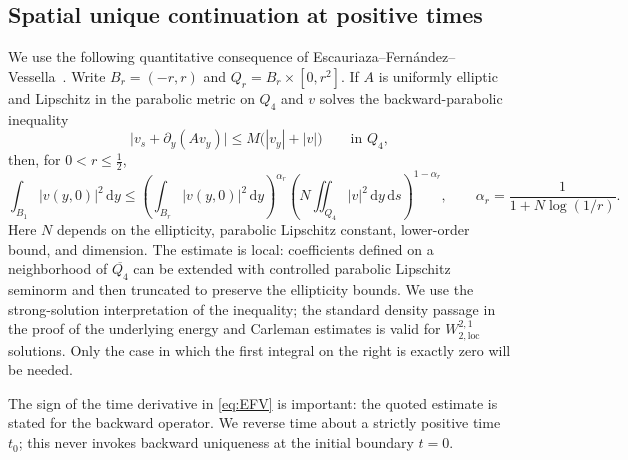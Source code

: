 \documentclass[11pt,reqno]{amsart}
\numberwithin{equation}{section}
\theoremstyle{definition}
\theoremstyle{remark}
\newcommand{\loc}{\mathrm{loc}}
\newcommand{\dd}{\,\mathrm d}
\begin{document}
\subsection{Spatial unique continuation at positive times}
We use the following quantitative consequence of
Escauriaza--Fern\'andez--Vessella~\cite[Theorem~2(2)]{EFV}.
Write $B_r=(-r,r)$ and $Q_r=B_r\times[0,r^2]$.  If $A$ is
uniformly elliptic and Lipschitz in the parabolic metric on $Q_4$
and $v$ solves the backward-parabolic inequality
\[
 \bigl|v_s+\partial_y(A v_y)\bigr|
 \leq M\bigl(|v_y|+|v|\bigr)
 \qquad\text{in }Q_4,
\]
then, for $0<r\leq\frac12$,
\begin{equation}\label{eq:EFV}
 \int_{B_1}|v(y,0)|^2\dd y
 \leq
 \left(\int_{B_r}|v(y,0)|^2\dd y\right)^{\alpha_r}
 \left(N\iint_{Q_4}|v|^2\dd y\dd s\right)^{1-\alpha_r},
 \qquad \alpha_r=\frac1{1+N\log(1/r)}.
\end{equation}
Here $N$ depends on the ellipticity, parabolic Lipschitz constant,
lower-order bound, and dimension.  The estimate is local: coefficients
defined on a neighborhood of $\overline{Q_4}$ can be extended with
controlled parabolic Lipschitz seminorm and then truncated to preserve
the ellipticity bounds.  We use the strong-solution interpretation of
the inequality; the standard density passage in the proof of the
underlying energy and Carleman estimates is valid for
$W^{2,1}_{2,\loc}$ solutions.  Only the case in which the first
integral on the right is exactly zero will be needed.

The sign of the time derivative in \eqref{eq:EFV} is important: the
quoted estimate is stated for the backward operator.  We reverse time
about a strictly positive time $t_0$; this never invokes backward
uniqueness at the initial boundary $t=0$.
\end{document}
